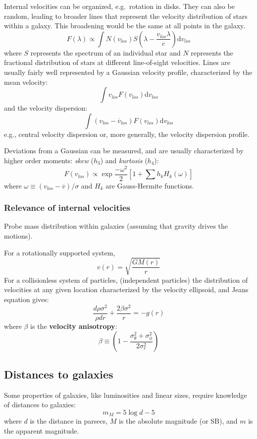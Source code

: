 \documentclass{article}
\newcommand{\mynotes}[1]{\textcolor{cadmiumorange}{#1}}
\begin{document}
Internal velocities can be organized, e.g.\ rotation in disks.
They can also be random, leading to broader lines that represent the
velocity distribution of stars within a galaxy.
\mynotes{This broadening would be the same at all points in the galaxy.}
\[
    F(\lambda) \propto \int{N(v_{los})S\left(\lambda-\frac{v_{los}\lambda}{c}
    \right)\mathrm{d}v_{los} }
\]
where $S$ represents the spectrum of an individual star and $N$
represents the fractional distribution of stars at different
line-of-sight velocities. Lines are usually fairly well represented
by a Gaussian velocity profile, characterized by the mean velocity:
\[
    \int{v_{los}F(v_{los})\mathrm{d}v_{los}}
\]
and the velocity dispersion:
\[
    \int{(v_{los}-\overline{v}_{los})F(v_{los})\mathrm{d}v_{los}}
\]
e.g., central velocity dispersion or, more generally, the velocity
dispersion profile.

Deviations from a Gaussian can be measured, and are usually characterized
by higher order moments: \textit{skew} ($h_{3}$) and \textit{kurtosis}
($h_{4}$):
\[
    F(v_{los}) \propto \exp\frac{-\omega^{2}}{2}\left[
        1 + \sum{h_{k}H_{k}(\omega)}\right]
\]
where $\omega \equiv (v_{los}-\overline{v})/\sigma$ and
$H_{k}$ are Gauss-Hermite functions.

\subsubsection{Relevance of internal velocities}
Probe mass distribution within
galaxies (assuming that gravity drives the motions).

For a rotationally supported system,
\[
    v(r) = \sqrt{\frac{GM(r)}{r}}
\]
For a collisionless system of particles, \mynotes{(independent particles)}
the distribution of velocities at
any given location characterized by the velocity ellipsoid, and
Jeans equation gives:
\[
    \frac{d\rho\sigma^{2}}{\rho{dr}} + \frac{2\beta\sigma^{2}}{r} = -g(r)
\]
where $\beta$ is the \textbf{velocity anisotropy}:
\[
    \beta \equiv \left(1-
    \frac{\sigma_{\theta}^{2}+\sigma_{\phi}^{2}}{2\sigma_{r}^{2}}\right)
\]

\subsection{Distances to galaxies}
Some properties of galaxies, like luminosities and linear sizes, require
knowledge of distances to galaxies:
\[
    m_{M} = 5\log{d}-5
\]
where $d$ is the distance in parsecs, $M$ is the absolute magnitude
(or SB), and $m$ is the apparent magnitude.
\end{document}
